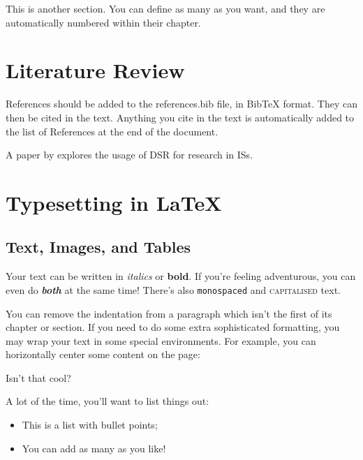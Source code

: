 \documentclass{thesis}
\begin{document}
This is another section. You can define as many as you want, and they are automatically numbered within their chapter.










\chapter{Literature Review}\label{ch:literature_review}

References should be added to the references.bib file, in BibTeX format. They can then be cited in the text. Anything you cite in the text is automatically added to the list of References at the end of the document.

A paper by \textcite{Peffers2007} explores the usage of \ac{DSR} for research in \acp{IS}.










\chapter{Typesetting in \LaTeX}\label{ch:typesetting}

\section{Text, Images, and Tables}\label{sec:text_images_tables}

Your text can be written in \textit{italics} or \textbf{bold}. If you're feeling adventurous, you can even do \textit{\textbf{both}} at the same time! There's also \texttt{monospaced} and \textsc{capitalised} text.

\noindent You can remove the indentation from a paragraph which isn't the first of its chapter or section. If you need to do some extra sophisticated formatting, you may wrap your text in some special environments. For example, you can horizontally center some content on the page:
\begin{center}
    Isn't that cool?
\end{center}

\noindent A lot of the time, you'll want to list things out:
\begin{itemize}
    \item This is a list with bullet points;
    \item You can add as many as you like!
\end{itemize}
\end{document}
